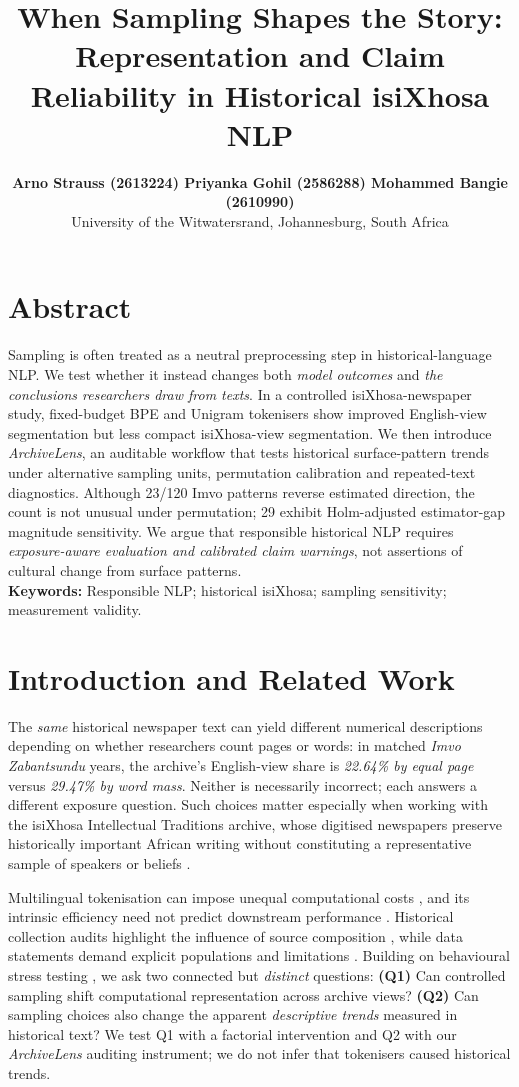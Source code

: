 \documentclass[10pt,letterpaper]{article}
\title{When Sampling Shapes the Story: Representation and Claim Reliability in Historical isiXhosa NLP}
\author{{\normalsize \bf Arno Strauss (2613224) \quad Priyanka Gohil (2586288) \quad Mohammed Bangie (2610990)}\\University of the Witwatersrand, Johannesburg, South Africa}
\date{}
\begin{document}
\maketitle
\vspace{-10pt}
\section{Abstract}
\noindent
Sampling is often treated as a neutral preprocessing step in historical-language NLP. We test whether it instead changes both \emph{model outcomes} and \emph{the conclusions researchers draw from texts}. In a controlled isiXhosa-newspaper study, fixed-budget BPE and Unigram tokenisers show improved English-view segmentation but less compact isiXhosa-view segmentation. We then introduce \emph{ArchiveLens}, an auditable workflow that tests historical surface-pattern trends under alternative sampling units, permutation calibration and repeated-text diagnostics. Although 23/120 Imvo patterns reverse estimated direction, the count is not unusual under permutation; 29 exhibit Holm-adjusted estimator-gap magnitude sensitivity. We argue that responsible historical NLP requires \emph{exposure-aware evaluation and calibrated claim warnings}, not assertions of cultural change from surface patterns.\\[-1pt]
\noindent\textbf{Keywords:} Responsible NLP; historical isiXhosa; sampling sensitivity; measurement validity.
\vspace{-4pt}
\section{Introduction and Related Work}
The \emph{same} historical newspaper text can yield different numerical descriptions depending on whether researchers count pages or words: in matched \emph{Imvo Zabantsundu} years, the archive's English-view share is \emph{22.64\% by equal page} versus \emph{29.47\% by word mass}. Neither is necessarily incorrect; each answers a different exposure question. Such choices matter especially when working with the isiXhosa Intellectual Traditions archive, whose digitised newspapers preserve historically important African writing without constituting a representative sample of speakers or beliefs \citep{schoots2023archive}.

Multilingual tokenisation can impose unequal computational costs \citep{petrov2023}, and its intrinsic efficiency need not predict downstream performance \citep{ali2024}. Historical collection audits highlight the influence of source composition \citep{beelen2025}, while data statements demand explicit populations and limitations \citep{bender2018}. Building on behavioural stress testing \citep{ribeiro2020}, we ask two connected but \emph{distinct} questions: \textbf{(Q1)} Can controlled sampling shift computational representation across archive views? \textbf{(Q2)} Can sampling choices also change the apparent \emph{descriptive trends} measured in historical text? We test Q1 with a factorial intervention and Q2 with our \emph{ArchiveLens} auditing instrument; we do not infer that tokenisers caused historical trends.
\end{document}
